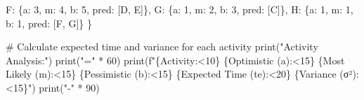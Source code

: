 \documentclass[
  letterpaper,
  DIV=11,
  numbers=noendperiod]{scrreprt}
\newenvironment{Shaded}{\begin{snugshade}}{\end{snugshade}}
\newcommand{\BuiltInTok}[1]{\textcolor[rgb]{0.00,0.23,0.31}{#1}}
\newcommand{\CommentTok}[1]{\textcolor[rgb]{0.37,0.37,0.37}{#1}}
\newcommand{\DecValTok}[1]{\textcolor[rgb]{0.68,0.00,0.00}{#1}}
\newcommand{\NormalTok}[1]{\textcolor[rgb]{0.00,0.23,0.31}{#1}}
\newcommand{\OperatorTok}[1]{\textcolor[rgb]{0.37,0.37,0.37}{#1}}
\newcommand{\SpecialCharTok}[1]{\textcolor[rgb]{0.37,0.37,0.37}{#1}}
\newcommand{\SpecialStringTok}[1]{\textcolor[rgb]{0.13,0.47,0.30}{#1}}
\newcommand{\StringTok}[1]{\textcolor[rgb]{0.13,0.47,0.30}{#1}}
\begin{document}
\begin{Shaded}
\begin{Highlighting}[]
        \StringTok{\textquotesingle{}F\textquotesingle{}}\NormalTok{: \{}\StringTok{\textquotesingle{}a\textquotesingle{}}\NormalTok{: }\DecValTok{3}\NormalTok{, }\StringTok{\textquotesingle{}m\textquotesingle{}}\NormalTok{: }\DecValTok{4}\NormalTok{, }\StringTok{\textquotesingle{}b\textquotesingle{}}\NormalTok{: }\DecValTok{5}\NormalTok{, }\StringTok{\textquotesingle{}pred\textquotesingle{}}\NormalTok{: [}\StringTok{\textquotesingle{}D\textquotesingle{}}\NormalTok{, }\StringTok{\textquotesingle{}E\textquotesingle{}}\NormalTok{]\},}
        \StringTok{\textquotesingle{}G\textquotesingle{}}\NormalTok{: \{}\StringTok{\textquotesingle{}a\textquotesingle{}}\NormalTok{: }\DecValTok{1}\NormalTok{, }\StringTok{\textquotesingle{}m\textquotesingle{}}\NormalTok{: }\DecValTok{2}\NormalTok{, }\StringTok{\textquotesingle{}b\textquotesingle{}}\NormalTok{: }\DecValTok{3}\NormalTok{, }\StringTok{\textquotesingle{}pred\textquotesingle{}}\NormalTok{: [}\StringTok{\textquotesingle{}C\textquotesingle{}}\NormalTok{]\},}
        \StringTok{\textquotesingle{}H\textquotesingle{}}\NormalTok{: \{}\StringTok{\textquotesingle{}a\textquotesingle{}}\NormalTok{: }\DecValTok{1}\NormalTok{, }\StringTok{\textquotesingle{}m\textquotesingle{}}\NormalTok{: }\DecValTok{1}\NormalTok{, }\StringTok{\textquotesingle{}b\textquotesingle{}}\NormalTok{: }\DecValTok{1}\NormalTok{, }\StringTok{\textquotesingle{}pred\textquotesingle{}}\NormalTok{: [}\StringTok{\textquotesingle{}F\textquotesingle{}}\NormalTok{, }\StringTok{\textquotesingle{}G\textquotesingle{}}\NormalTok{]\}}
\NormalTok{    \}}
    
    \CommentTok{\# Calculate expected time and variance for each activity}
    \BuiltInTok{print}\NormalTok{(}\StringTok{"Activity Analysis:"}\NormalTok{)}
    \BuiltInTok{print}\NormalTok{(}\StringTok{"="} \OperatorTok{*} \DecValTok{60}\NormalTok{)}
    \BuiltInTok{print}\NormalTok{(}\SpecialStringTok{f"}\SpecialCharTok{\{}\StringTok{\textquotesingle{}Activity\textquotesingle{}}\SpecialCharTok{:\textless{}10\}}\SpecialStringTok{ }\SpecialCharTok{\{}\StringTok{\textquotesingle{}Optimistic (a)\textquotesingle{}}\SpecialCharTok{:\textless{}15\}}\SpecialStringTok{ }\SpecialCharTok{\{}\StringTok{\textquotesingle{}Most Likely (m)\textquotesingle{}}\SpecialCharTok{:\textless{}15\}}\SpecialStringTok{ }\SpecialCharTok{\{}\StringTok{\textquotesingle{}Pessimistic (b)\textquotesingle{}}\SpecialCharTok{:\textless{}15\}}\SpecialStringTok{ }\SpecialCharTok{\{}\StringTok{\textquotesingle{}Expected Time (te)\textquotesingle{}}\SpecialCharTok{:\textless{}20\}}\SpecialStringTok{ }\SpecialCharTok{\{}\StringTok{\textquotesingle{}Variance (σ²)\textquotesingle{}}\SpecialCharTok{:\textless{}15\}}\SpecialStringTok{"}\NormalTok{)}
    \BuiltInTok{print}\NormalTok{(}\StringTok{"{-}"} \OperatorTok{*} \DecValTok{90}\NormalTok{)}
    

\end{Highlighting}
\end{Shaded}
\end{document}
